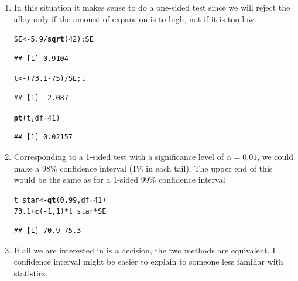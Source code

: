 \documentclass[twoside]{book}\usepackage[]{graphicx}\usepackage[]{xcolor}
\makeatletter
\newcommand{\hlnum}[1]{\textcolor[rgb]{0.686,0.059,0.569}{#1}}%
\newcommand{\hlopt}[1]{\textcolor[rgb]{0,0,0}{#1}}%
\newcommand{\hlstd}[1]{\textcolor[rgb]{0.345,0.345,0.345}{#1}}%
\newcommand{\hlkwb}[1]{\textcolor[rgb]{0.69,0.353,0.396}{#1}}%
\newcommand{\hlkwc}[1]{\textcolor[rgb]{0.333,0.667,0.333}{#1}}%
\newcommand{\hlkwd}[1]{\textcolor[rgb]{0.737,0.353,0.396}{\textbf{#1}}}%
\newenvironment{kframe}{%
 \def\at@end@of@kframe{}%
 \ifinner\ifhmode%
  \def\at@end@of@kframe{\end{minipage}}%
  \begin{minipage}{\columnwidth}%
 \fi\fi%
 \def\FrameCommand##1{\hskip\@totalleftmargin \hskip-\fboxsep
 \colorbox{shadecolor}{##1}\hskip-\fboxsep
     \hskip-\linewidth \hskip-\@totalleftmargin \hskip\columnwidth}%
 \MakeFramed {\advance\hsize-\width
   \@totalleftmargin\z@ \linewidth\hsize
   \@setminipage}}%
 {\par\unskip\endMakeFramed%
 \at@end@of@kframe}
\newenvironment{knitrout}{}{} %
\makeatother
\begin{document}
\begin{solution}
	\begin{enumerate}
		\item
			In this situation it makes sense to do a one-sided test since we will reject
			the alloy only if the amount of expansion is to high, not if it is too low.
\begin{knitrout}
\color{fgcolor}\begin{kframe}
\begin{alltt}
\hlstd{SE} \hlkwb{<-} \hlnum{5.9}\hlopt{/}\hlkwd{sqrt}\hlstd{(}\hlnum{42}\hlstd{); SE}
\end{alltt}
\begin{verbatim}
## [1] 0.9104
\end{verbatim}
\begin{alltt}
\hlstd{t} \hlkwb{<-} \hlstd{(}\hlnum{73.1} \hlopt{-} \hlnum{75}\hlstd{)} \hlopt{/} \hlstd{SE; t}
\end{alltt}
\begin{verbatim}
## [1] -2.087
\end{verbatim}
\begin{alltt}
\hlkwd{pt}\hlstd{(t,} \hlkwc{df} \hlstd{=} \hlnum{41}\hlstd{)}
\end{alltt}
\begin{verbatim}
## [1] 0.02157
\end{verbatim}
\end{kframe}
\end{knitrout}
		\item
			Corresponding to a 1-sided test with a significance level of $\alpha = 0.01$,
			we could make a 98\% confidence interval (1\% in each tail).  The upper end of this
			would be the same as for a 1-sided 99\% confidence interval
\begin{knitrout}
\color{fgcolor}\begin{kframe}
\begin{alltt}
\hlstd{t_star} \hlkwb{<-} \hlkwd{qt}\hlstd{(}\hlnum{0.99}\hlstd{,} \hlkwc{df} \hlstd{=} \hlnum{41}\hlstd{)}
\hlnum{73.1} \hlopt{+} \hlkwd{c}\hlstd{(}\hlopt{-}\hlnum{1}\hlstd{,} \hlnum{1}\hlstd{)} \hlopt{*} \hlstd{t_star} \hlopt{*} \hlstd{SE}
\end{alltt}
\begin{verbatim}
## [1] 70.9 75.3
\end{verbatim}
\end{kframe}
\end{knitrout}
		\item
			If all we are interested in is a decision, the two methods are equivalent.
			I confidence interval might be easier to explain to someone less familiar with
			statistics.
	\end{enumerate}
\end{solution}
\end{document}
